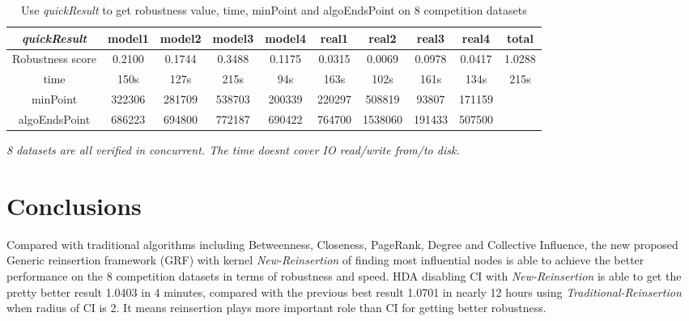 \documentclass{article}
\begin{document}
	\begin{table}[!htbp]
	\begin{adjustwidth}{-1cm}{}		
		\begin{threeparttable}		
			\centering
			\caption{ Use \textit{quickResult} to get robustness value, time, minPoint and algoEndsPoint on 8 competition datasets }
			\label{tab:table17}
			\begin{tabular}{|c|c|c|c|c|c|c|c|c|c|}
				\hline		
				
				\textit{quickResult}        & \textbf{model1} & \textbf{model2} & \textbf{model3} & \textbf{model4} & \textbf{real1} & \textbf{real2} & \textbf{real3} & \textbf{real4} & \textbf{total} \\ \hline
				Robustness score & 0.2100          & 0.1744          & 0.3488          & 0.1175          & 0.0315         & 0.0069         & 0.0978         & 0.0417         & 1.0288         \\ \hline
				time             & 150s            & 127s            & 215s            & 94s             & 163s           & 102s           & 161s           & 134s           & 215s           \\ \hline
				minPoint         & 322306          & 281709          & 538703          & 200339          & 220297         & 508819         & 93807          & 171159         &                \\ \hline
				algoEndsPoint    & 686223          & 694800          & 772187          & 690422          & 764700         & 1538060        & 191433         & 507500         &                \\ \hline

			\end{tabular}
			\begin{tablenotes}
				\small
				\item\textit{ 8 datasets are all verified in concurrent. The time doesn\textquotesingle t cover IO read/write from/to disk.}
			\end{tablenotes}			
		\end{threeparttable}
	\end{adjustwidth}	
	\end{table}		
	
	
	\section{Conclusions}
	
	Compared with traditional algorithms including Betweenness, Closeness, PageRank, Degree and Collective Influence, the new proposed Generic reinsertion framework (GRF) with kernel \textit{New-Reinsertion} of finding most influential nodes is able to achieve the better performance on the 8 competition datasets in terms of robustness and speed. HDA disabling CI with \textit{New-Reinsertion} is able to get the pretty better result 1.0403 in 4 minutes, compared with the previous best result 1.0701 in nearly 12 hours using \textit{Traditional-Reinsertion} when radius of CI is 2. It means reinsertion plays more important role than CI for getting better robustness.
	
\end{document}
